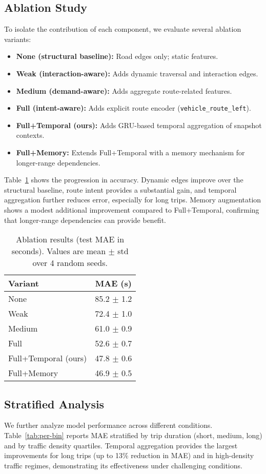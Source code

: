 \subsection{Ablation Study}
To isolate the contribution of each component, we evaluate several ablation variants:
\begin{itemize}
    \item \textbf{None (structural baseline):} Road edges only; static features.
    \item \textbf{Weak (interaction-aware):} Adds dynamic traversal and interaction edges.
    \item \textbf{Medium (demand-aware):} Adds aggregate route-related features.
    \item \textbf{Full (intent-aware):} Adds explicit route encoder (\texttt{vehicle\_route\_left}).
    \item \textbf{Full+Temporal (ours):} Adds GRU-based temporal aggregation of snapshot contexts.
    \item \textbf{Full+Memory:} Extends Full+Temporal with a memory mechanism for longer-range dependencies.
\end{itemize}

Table~\ref{tab:ablation} shows the progression in accuracy. 
Dynamic edges improve over the structural baseline, route intent provides a substantial gain, and temporal aggregation further reduces error, especially for long trips. 
Memory augmentation shows a modest additional improvement compared to Full+Temporal, confirming that longer-range dependencies can provide benefit.

\begin{table}[t]
\centering
\caption{Ablation results (test MAE in seconds). Values are mean $\pm$ std over 4 random seeds.}
\label{tab:ablation}
\begin{tabular}{lc}
\toprule
Variant & MAE (s) \\
\midrule
None & 85.2 $\pm$ 1.2 \\
Weak & 72.4 $\pm$ 1.0 \\
Medium & 61.0 $\pm$ 0.9 \\
Full & 52.6 $\pm$ 0.7 \\
Full+Temporal (ours) & 47.8 $\pm$ 0.6 \\
Full+Memory & 46.9 $\pm$ 0.5 \\
\bottomrule
\end{tabular}
\end{table}

\subsection{Stratified Analysis}
We further analyze model performance across different conditions. 
Table~\ref{tab:per-bin} reports MAE stratified by trip duration (short, medium, long) and by traffic density quartiles. 
Temporal aggregation provides the largest improvements for long trips (up to 13\% reduction in MAE) and in high-density traffic regimes, demonstrating its effectiveness under challenging conditions.


